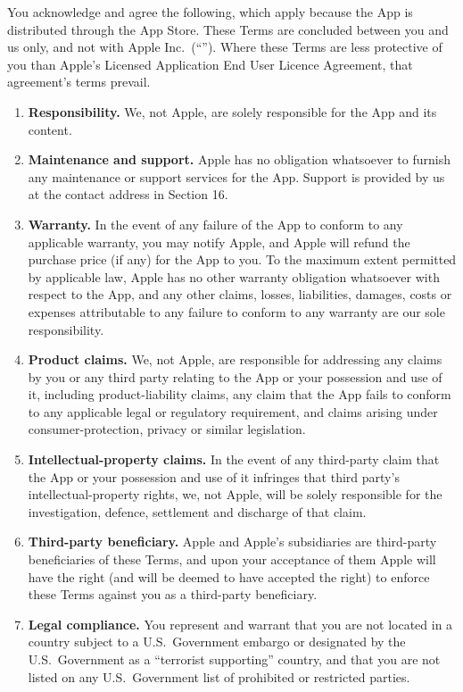 \documentclass[11pt]{article}
\begin{document}
You acknowledge and agree the following, which apply because the App is distributed
through the App Store. These Terms are concluded between you and us only, and not with
Apple Inc.\ (“”). Where these Terms are less protective of you than
Apple's Licensed Application End User Licence Agreement, that agreement's terms prevail.

\begin{enumerate}[label=\textbf{14.\arabic*}]
  \item \textbf{Responsibility.} We, not Apple, are solely responsible for the App and
        its content.
  \item \textbf{Maintenance and support.} Apple has no obligation whatsoever to furnish
        any maintenance or support services for the App. Support is provided by us at
        the contact address in Section 16.
  \item \textbf{Warranty.} In the event of any failure of the App to conform to any
        applicable warranty, you may notify Apple, and Apple will refund the purchase
        price (if any) for the App to you. To the maximum extent permitted by
        applicable law, Apple has no other warranty obligation whatsoever with respect
        to the App, and any other claims, losses, liabilities, damages, costs or
        expenses attributable to any failure to conform to any warranty are our sole
        responsibility.
  \item \textbf{Product claims.} We, not Apple, are responsible for addressing any
        claims by you or any third party relating to the App or your possession and use
        of it, including product-liability claims, any claim that the App fails to
        conform to any applicable legal or regulatory requirement, and claims arising
        under consumer-protection, privacy or similar legislation.
  \item \textbf{Intellectual-property claims.} In the event of any third-party claim
        that the App or your possession and use of it infringes that third party's
        intellectual-property rights, we, not Apple, will be solely responsible for the
        investigation, defence, settlement and discharge of that claim.
  \item \textbf{Third-party beneficiary.} Apple and Apple's subsidiaries are
        third-party beneficiaries of these Terms, and upon your acceptance of them
        Apple will have the right (and will be deemed to have accepted the right) to
        enforce these Terms against you as a third-party beneficiary.
  \item \textbf{Legal compliance.} You represent and warrant that you are not located
        in a country subject to a U.S.\ Government embargo or designated by the U.S.\
        Government as a “terrorist supporting” country, and that you are not listed
        on any U.S.\ Government list of prohibited or restricted parties.
\end{enumerate}
\end{document}
